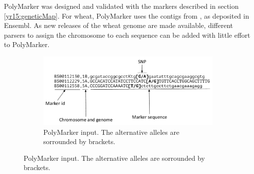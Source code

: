 PolyMarker was designed and validated with the markers described in section \ref{yr15:geneticMap}. 
For wheat, PolyMarker uses the contigs from \cite{Mayer2014}, as deposited in Ensembl. 
As new releases of the wheat genome are made available, different parsers to assign the chromosome to each sequence can be added with little effort to PolyMarker. 

\begin{figure}
    \centering
    \begin{subfigure}[b]{0.8\textwidth}
        \includegraphics[width=1\textwidth]{PolyMarker/Figures/aln/input.pdf} 
        \caption{PolyMarker input. The alternative alleles are sorrounded by brackets.}
        \label{fig:poly:input}
    \end{subfigure}


\end{figure}
